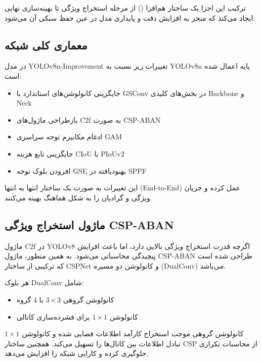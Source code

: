 \documentclass[a4paper, 10pt, twocolumn]{article}
\begin{document}
	ترکیب این اجزا یک ساختار هم‌افزا () از مرحله استخراج ویژگی تا بهینه‌سازی نهایی ایجاد می‌کند که منجر به افزایش دقت و پایداری مدل در عین حفظ سبکی آن می‌شود.
	
	
	\subsection{معماری کلی شبکه}
	
	در مدل YOLOv8n-Improvement تغییرات زیر نسبت به YOLOv8n پایه اعمال شده است:
	
	\begin{itemize}
		\item جایگزینی کانولوشن‌های استاندارد با GSConv در بخش‌های کلیدی Backbone و Neck
		\item بازطراحی ماژول‌های C2f به صورت CSP-ABAN
		\item ادغام مکانیزم توجه سراسری GAM
		\item جایگزینی تابع هزینه CIoU با PIoUv2
		\item افزودن بلوک توجه GSE بهبودیافته در SPPF
	\end{itemize}
	
	این تغییرات به صورت یک ساختار انتها به انتها (End-to-End) عمل کرده و جریان ویژگی و گرادیان را به شکل هماهنگ بهینه می‌کنند.
	
	
	\subsection{ماژول استخراج ویژگی CSP-ABAN}
	
	ماژول C2f در YOLOv8 اگرچه قدرت استخراج ویژگی بالایی دارد، اما باعث افزایش پیچیدگی محاسباتی می‌شود. به همین منظور، ماژول CSP-ABAN طراحی شده است که ترکیبی از ساختار CSPNet و کانولوشن دو مسیره (DualConv) می‌باشد.
	
	هر بلوک DualConv شامل:
	
	\begin{itemize}
		\item کانولوشن گروهی $3 \times 3$ با 4 گروه
		\item کانولوشن $1 \times 1$ برای فشرده‌سازی کانالی
	\end{itemize}
	
	کانولوشن گروهی موجب استخراج کارآمد اطلاعات فضایی شده و کانولوشن $1 \times 1$ تبادل اطلاعات بین کانال‌ها را تسهیل می‌کند. همچنین ساختار CSP از محاسبات تکراری جلوگیری کرده و کارایی شبکه را افزایش می‌دهد.
	
\end{document}
